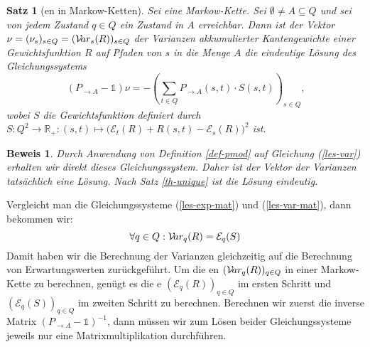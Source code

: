 \documentclass[a4paper]{article}
\newcommand{\mc}{Markow-Kette}
\newtheorem{satz}{Satz}[section] %
\theoremstyle{nonumberplain}
\newtheorem{beweis}{Beweis}
\begin{document}
\begin{satz}[\var{}en in \mc{}n] \label{th-var}
		Sei \mcex{} eine \mc{}. Sei $\emptyset \neq A\subseteq Q$ und sei von jedem Zustand $q\in Q$ ein Zustand in $A$ erreichbar. Dann ist der Vektor $\nu = (\nu_s)_{s \in Q } = (\mathcal{V}\!ar_{s}(R))_{s \in Q }$ der Varianzen akkumulierter Kantengewichte einer Gewichtsfunktion $R$ auf Pfaden von $s$ in die Menge $A$ die eindeutige Lösung des Gleichungssystems	
	\begin{equation}
	(P_{\rightarrow A} - \mathbb{1}) \nu = - \left(\sum_{t \in Q}{ P_{\rightarrow A}(s,t) \cdot S(s,t) }\right)_{s \in Q}\text{,}\label{les-var-mat}
	\end{equation}
	wobei $S$ die Gewichtsfunktion definiert durch $S: Q^2 \to \mathbb{R}_+ : (s,t) \mapsto \big(\mathcal{E}_{t}(R) + R(s,t) - \mathcal{E}_{s}(R)\big)^2$ ist.
\end{satz}
\begin{beweis}
	Durch Anwendung von Definition \ref{def-pmod} auf Gleichung (\ref{les-var}) erhalten wir direkt dieses Gleichungssystem. Daher ist der Vektor der Varianzen tatsächlich eine Lösung. Nach Satz \ref{th-unique} ist die Lösung eindeutig.
\end{beweis}

Vergleicht man die Gleichungssysteme (\ref{les-exp-mat}) und (\ref{les-var-mat}), dann bekommen wir:
\begin{equation}
\forall q \in Q : \mathcal{V}\!ar_q(R) = \mathcal{E}_q(S)
\end{equation}
Damit haben wir die Berechnung der Varianzen gleichzeitig auf die Berechnung von Erwartungswerten zurückgeführt. Um die \var{}en $(\mathcal{V}\!ar_q(R))_{q\in Q}$ in einer \mc{} zu berechnen, genügt es die \expect{}e $(\mathcal{E}_q(R))_{q\in Q}$ im ersten Schritt und $(\mathcal{E}_q(S))_{q\in Q}$ im zweiten Schritt zu berechnen. 
Berechnen wir zuerst die inverse Matrix $(P_{\rightarrow A} - \mathbb{1})^{-1}$, dann müssen wir zum Lösen beider Gleichungssysteme jeweils nur eine Matrixmultiplikation durchführen.
\end{document}
